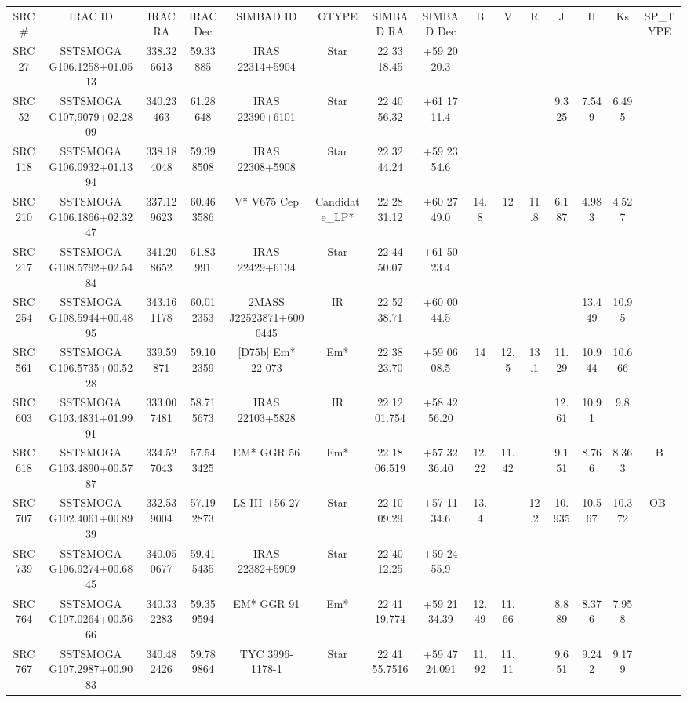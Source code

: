 \begin{table}
\begin{tabular}{ccccccccccccccc}
SRC # & IRAC ID & IRAC RA & IRAC Dec & SIMBAD ID & OTYPE & SIMBAD RA & SIMBAD Dec & B & V & R & J & H & Ks & SP_TYPE \\
SRC27 & SSTSMOGA G106.1258+01.0513 & 338.326613 & 59.33885 & IRAS 22314+5904 & Star & 22 33 18.45 & +59 20 20.3 &  &  &  &  &  &  &  \\
SRC52 & SSTSMOGA G107.9079+02.2809 & 340.23463 & 61.28648 & IRAS 22390+6101 & Star & 22 40 56.32 & +61 17 11.4 &  &  &  & 9.325 & 7.549 & 6.495 &  \\
SRC118 & SSTSMOGA G106.0932+01.1394 & 338.184048 & 59.398508 & IRAS 22308+5908 & Star & 22 32 44.24 & +59 23 54.6 &  &  &  &  &  &  &  \\
SRC210 & SSTSMOGA G106.1866+02.3247 & 337.129623 & 60.463586 & V* V675 Cep & Candidate_LP* & 22 28 31.12 & +60 27 49.0 & 14.8 & 12 & 11.8 & 6.187 & 4.983 & 4.527 &  \\
SRC217 & SSTSMOGA G108.5792+02.5484 & 341.208652 & 61.83991 & IRAS 22429+6134 & Star & 22 44 50.07 & +61 50 23.4 &  &  &  &  &  &  &  \\
SRC254 & SSTSMOGA G108.5944+00.4895 & 343.161178 & 60.012353 & 2MASS J22523871+6000445 & IR & 22 52 38.71 & +60 00 44.5 &  &  &  &  & 13.449 & 10.95 &  \\
SRC561 & SSTSMOGA G106.5735+00.5228 & 339.59871 & 59.102359 & [D75b] Em* 22-073 & Em* & 22 38 23.70 & +59 06 08.5 & 14 & 12.5 & 13.1 & 11.29 & 10.944 & 10.666 &  \\
SRC603 & SSTSMOGA G103.4831+01.9991 & 333.007481 & 58.715673 & IRAS 22103+5828 & IR & 22 12 01.754 & +58 42 56.20 &  &  &  & 12.61 & 10.91 & 9.8 &  \\
SRC618 & SSTSMOGA G103.4890+00.5787 & 334.527043 & 57.543425 & EM* GGR   56 & Em* & 22 18 06.519 & +57 32 36.40 & 12.22 & 11.42 &  & 9.151 & 8.766 & 8.363 & B \\
SRC707 & SSTSMOGA G102.4061+00.8939 & 332.539004 & 57.192873 & LS III +56   27 & Star & 22 10 09.29 & +57 11 34.6 & 13.4 &  & 12.2 & 10.935 & 10.567 & 10.372 & OB- \\
SRC739 & SSTSMOGA G106.9274+00.6845 & 340.050677 & 59.415435 & IRAS 22382+5909 & Star & 22 40 12.25 & +59 24 55.9 &  &  &  &  &  &  &  \\
SRC764 & SSTSMOGA G107.0264+00.5666 & 340.332283 & 59.359594 & EM* GGR   91 & Em* & 22 41 19.774 & +59 21 34.39 & 12.49 & 11.66 &  & 8.889 & 8.376 & 7.958 &  \\
SRC767 & SSTSMOGA G107.2987+00.9083 & 340.482426 & 59.789864 & TYC 3996-1178-1 & Star & 22 41 55.7516 & +59 47 24.091 & 11.92 & 11.11 &  & 9.651 & 9.242 & 9.179 &  \\

\end{tabular}
\end{table}
